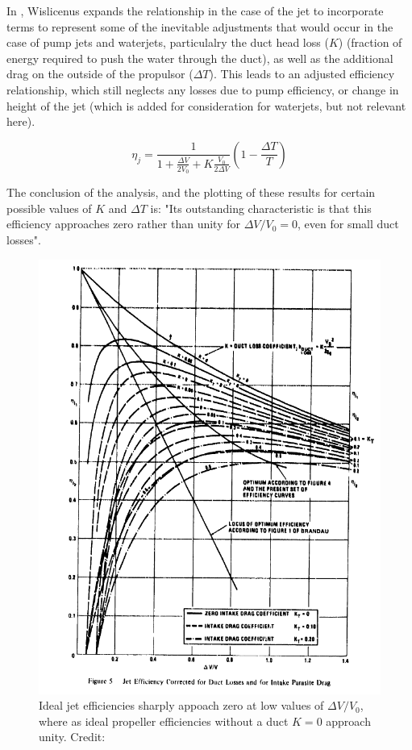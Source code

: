 \documentclass{article}\usepackage[]{graphicx}\usepackage[]{color}
\begin{document}
In \cite[8-14]{wislicenus1973}, Wislicenus expands the relationship in the case of the jet to incorporate terms to represent some of the inevitable adjustments that would occur in the case of pump jets and waterjets, particulalry the duct head loss ($K$) (fraction of energy required to push the water through the duct), as well as the additional drag on the outside of the propulsor ($\Delta T$).  This leads to an adjusted efficiency relationship, which still neglects any losses due to pump efficiency, or change in height of the jet (which is added for consideration for waterjets, but not relevant here).


\begin{equation}
\label{eq:4}
\eta_j = \frac{1}{1 + \frac{\Delta V}{2V_0} + K\frac{V_0}{2 \Delta V}}(1 - \frac{\Delta T}{T})
\end{equation}


The conclusion of the analysis, and the plotting of these results for certain possible values of $K$ and $\Delta T$ is: "Its outstanding characteristic is that this efficiency approaches zero rather than unity for $\Delta V / V_0 = 0$, even for small duct losses".

\begin{figure}
\includegraphics[width=\textwidth]{PumpjetEfficiency.png}
\caption{Ideal jet efficiencies sharply appoach zero at low values of $\Delta V / V_0$, where as ideal propeller efficiencies without a duct $K = 0$ approach unity. Credit: \cite{wislicenus1973}}
\label{fig:PumpjetEfficiency.png}
\end{figure}
\end{document}
